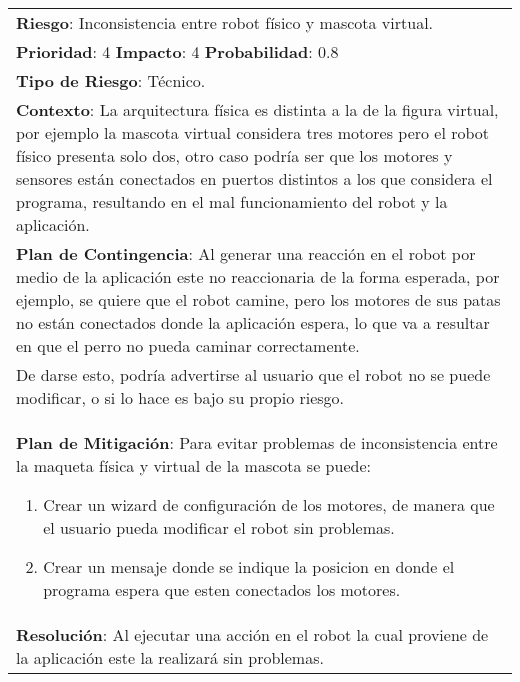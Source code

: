 \begin{table}[htbp!]
  \begin{tabular}{|p{15cm}|}\hline
    {\bf Riesgo}: Inconsistencia entre robot f\'isico y mascota virtual.\\%
    {\bf Prioridad}: 4  {\bf Impacto}: 4  {\bf Probabilidad}: 0.8\\%
    {\bf Tipo de Riesgo}: T\'ecnico.\\%
    {\bf Contexto}: La arquitectura f\'isica es distinta a la de la figura virtual, por ejemplo la mascota virtual considera tres motores pero el robot f\'isico presenta solo dos, otro caso podr\'ia ser que los motores y sensores est\'an conectados en puertos distintos a los que considera el programa, resultando en el mal funcionamiento del robot y la aplicaci\'on.\\%
    {\bf Plan de Contingencia}: Al generar una reacci\'on en el robot por medio de la aplicaci\'on este no reaccionaria de la forma esperada, por ejemplo, se quiere que el robot camine, pero los motores de sus patas no est\'an conectados donde la aplicaci\'on espera, lo que va a resultar en que el perro no pueda caminar correctamente.\\De darse esto, podr\'ia advertirse al usuario que el robot no se puede modificar, o si lo hace es bajo su propio riesgo.\\%
    {\bf Plan de Mitigaci\'on}: Para evitar problemas de inconsistencia entre la maqueta f\'isica y virtual de la mascota se puede:\begin{enumerate}\item Crear un wizard de configuraci\'on de los motores, de manera que el usuario pueda modificar el robot sin problemas.\item Crear un mensaje donde se indique la posicion en donde el programa espera que esten conectados los motores.\end{enumerate}\\%
    {\bf Resoluci\'on}: Al ejecutar una acci\'on en el robot la cual proviene de la aplicaci\'on este la realizar\'a sin problemas.\\\hline
  \end{tabular}
  \caption{}
  \label{table:R3}
\end{table}


